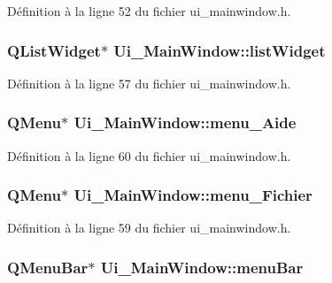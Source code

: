 Définition à la ligne 52 du fichier ui\-\_\-mainwindow.\-h.

\hypertarget{class_ui___main_window_ae647a15635ba8a0e5d5aec475db99d8f}{
\subsubsection[{list\-Widget}]{\setlength{\rightskip}{0pt plus 5cm}Q\-List\-Widget$\ast$ Ui\-\_\-\-Main\-Window\-::list\-Widget}}\label{class_ui___main_window_ae647a15635ba8a0e5d5aec475db99d8f}


Définition à la ligne 57 du fichier ui\-\_\-mainwindow.\-h.

\hypertarget{class_ui___main_window_a7636ad8f82f2e9113d3139a059d4b306}{
\subsubsection[{menu\-\_\-\-Aide}]{\setlength{\rightskip}{0pt plus 5cm}Q\-Menu$\ast$ Ui\-\_\-\-Main\-Window\-::menu\-\_\-\-Aide}}\label{class_ui___main_window_a7636ad8f82f2e9113d3139a059d4b306}


Définition à la ligne 60 du fichier ui\-\_\-mainwindow.\-h.

\hypertarget{class_ui___main_window_a073cce6e21486d944090502ae6949476}{
\subsubsection[{menu\-\_\-\-Fichier}]{\setlength{\rightskip}{0pt plus 5cm}Q\-Menu$\ast$ Ui\-\_\-\-Main\-Window\-::menu\-\_\-\-Fichier}}\label{class_ui___main_window_a073cce6e21486d944090502ae6949476}


Définition à la ligne 59 du fichier ui\-\_\-mainwindow.\-h.

\hypertarget{class_ui___main_window_a2be1c24ec9adfca18e1dcc951931457f}{
\subsubsection[{menu\-Bar}]{\setlength{\rightskip}{0pt plus 5cm}Q\-Menu\-Bar$\ast$ Ui\-\_\-\-Main\-Window\-::menu\-Bar}}\label{class_ui___main_window_a2be1c24ec9adfca18e1dcc951931457f}


